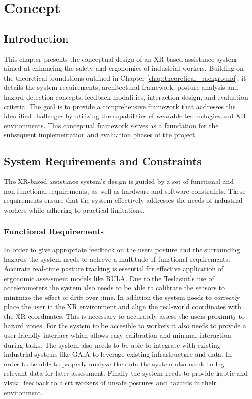 \chapter{Concept}
\label{chap:concept}

\section{Introduction}
This chapter presents the conceptual design of an XR-based assistance system aimed at enhancing the safety and ergonomics of industrial workers. Building on the theoretical foundations outlined in Chapter \ref{chap:theoretical_background}, it details the system requirements, architectural framework, posture analysis and hazard detection concepts, feedback modalities, interaction design, and evaluation criteria. The goal is to provide a comprehensive framework that addresses the identified challenges by utilizing the capabilities of wearable technologies and XR environments. This conceptual framework serves as a foundation for the subsequent implementation and evaluation phases of the project.

\section{System Requirements and Constraints}
The XR-based assistance system's design is guided by a set of functional and non-functional requirements, as well as hardware and software constraints. These requirements ensure that the system effectively addresses the needs of industrial workers while adhering to practical limitations.

\subsection{Functional Requirements}
In order to give appropriate feedback on the users posture and the surrounding hazards the system needs to achieve a multitude of functional requirements. 
Accurate real-time posture tracking is essential for effective application of ergonomic assessment models like RULA. Due to the Teslasuit's use of accelerometers the system also needs to be able to calibrate the sensors to minimize the effect of drift over time. In addition the system needs to correctly place the user in the XR environment and align the real-world coordinates with the XR coordinates. This is necessary to accurately assess the users proximity to hazard zones. For the system to be accesible to workers it also needs to provide a user-friendly interface which allows easy calibration and minimal interaction during tasks. The system also needs to be able to integrate with existing industrial systems like GAIA to leverage existing infrastructure and data. In order to be able to properly analyze the data the system also needs to log relevant data for later assessment. Finally the system needs to provide haptic and visual feedback to alert workers of unsafe postures and hazards in their environment.

